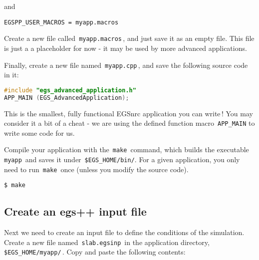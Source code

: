 \documentclass[12pt,twoside]{article}
\begin{document}
and

\begin{lstlisting}
EGSPP_USER_MACROS = myapp.macros
\end{lstlisting}

Create a new file called \,\Verb|myapp.macros|\,, and just save it as an empty
file. This file is just a a placeholder for now - it may be used by
more advanced applications.

Finally, create a new file named \,\Verb|myapp.cpp|\,, and save the following
source code in it:

\begin{lstlisting}[language=c++,backgroundcolor=\color{white}]
#include "egs_advanced_application.h"
APP_MAIN (EGS_AdvancedApplication);
\end{lstlisting}

This is the smallest, fully functional EGSnrc application you can write\,!
You may consider it a bit of a cheat - we are using the defined function macro
\,\Verb|APP_MAIN| to write some code for us.

Compile your application with the \,\Verb|make|\, command, which builds the
executable \,\Verb|myapp|\, and saves it under \,\Verb|$EGS_HOME/bin/|. For a
given application, you only need to run \,\Verb|make|\, once
(unless you modify the source code).
\begin{lstlisting}
$ make
\end{lstlisting}

\subsection{Create an egs++ input file}

Next we need to create an input file to define the conditions of the simulation.
Create a new file named \,\Verb|slab.egsinp|\, in the application directory,
\,\Verb|$EGS_HOME/myapp/|\,. Copy and paste the following contents:
\end{document}
